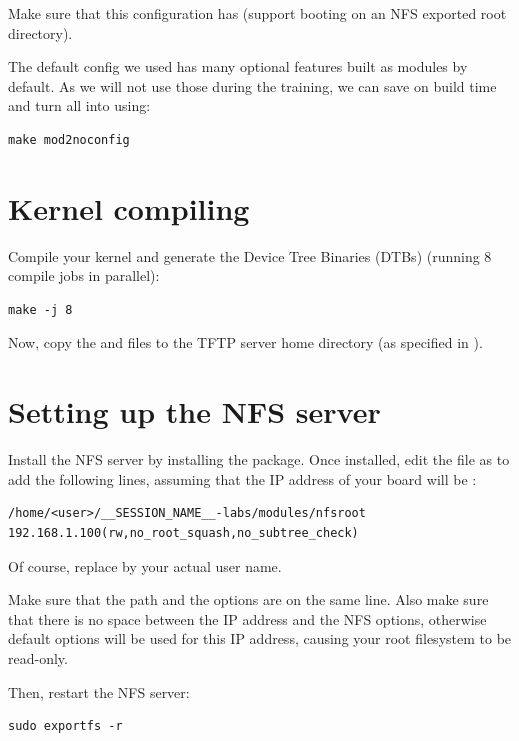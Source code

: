Make sure that this configuration has  (support
booting on an NFS exported root directory).

The default config we used has many optional features built as modules
by default. As we will not use those during the training, we can save
on build time and turn all  into  using:

\begin{verbatim}
make mod2noconfig
\end{verbatim}

\section{Kernel compiling}

Compile your kernel and generate the Device Tree Binaries (DTBs)
(running 8 compile jobs in parallel):

\begin{verbatim}
make -j 8
\end{verbatim}

Now, copy the  and  files to the
TFTP server home directory (as specified in ).

\section{Setting up the NFS server}

Install the NFS server by installing the 
package. Once installed, edit the  file as
 to add the following lines, assuming that the IP address
of your board will be :

\scriptsize
\begin{verbatim}
/home/<user>/__SESSION_NAME__-labs/modules/nfsroot 192.168.1.100(rw,no_root_squash,no_subtree_check)
\end{verbatim}
\normalsize

Of course, replace  by your actual user name.

Make sure that the path and the options are on the same line.
Also make sure that there is no space between the IP address and the NFS
options, otherwise default options will be used for this IP address,
causing your root filesystem to be read-only.

Then, restart the NFS server:

\begin{verbatim}
sudo exportfs -r
\end{verbatim}

